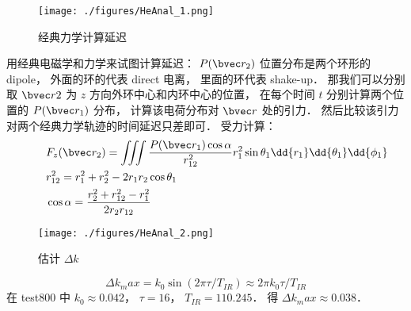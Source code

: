 \begin{figure}[ht]
\centering
\texttt{[image: ./figures/HeAnal\_1.png]}
\caption{经典力学计算延迟} \label{HeAnal_fig1}
\end{figure}

用经典电磁学和力学来试图计算延迟： $P(\bvec r_2)$ 位置分布是两个环形的 dipole， 外面的环的代表 direct 电离， 里面的环代表 shake-up． 那我们可以分别取 $\bvec r2$ 为 $z$ 方向外环中心和内环中心的位置， 在每个时间 $t$ 分别计算两个位置的 $P(\bvec r_1)$ 分布， 计算该电荷分布对 $\bvec r$ 处的引力． 然后比较该引力对两个经典力学轨迹的时间延迟只差即可． 受力计算：
\begin{equation}
\begin{aligned}
&F_z(\bvec r_2) = \iiint \frac{P(\bvec r_1) \cos\alpha}{r_{12}^2} r_1^2\sin\theta_1 \dd{r_1}\dd{\theta_1}\dd{\phi_1}\\
\qquad
&r_{12}^2 = r_1^2 + r_2^2 - 2r_1r_2 \cos\theta_1\\
&\cos\alpha = \frac{r_2^2 + r_{12}^2 - r_1^2}{2r_2 r_{12}}
\end{aligned}
\end{equation}

\begin{figure}[ht]
\centering
\texttt{[image: ./figures/HeAnal\_2.png]}
\caption{估计 $\Delta k$} \label{HeAnal_fig2}
\end{figure}
\begin{equation}
\Delta k_max = k_0 \sin(2\pi \tau/T_{IR}) \approx 2 \pi k_0  \tau/T_{IR}
\end{equation}
在 test800 中 $k_0 \approx 0.042$， $\tau = 16$， $T_{IR} = 110.245$． 得 $\Delta k_max \approx 0.038$．
